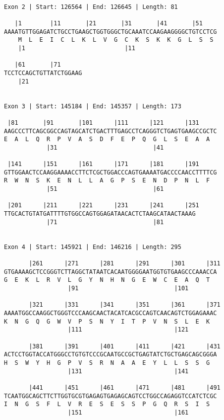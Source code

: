 \documentclass{article}
\begin{document}
 \begin{Verbatim}
 
Exon 2 | Start: 126564 | End: 126645 | Length: 81
 
   |1        |11       |21       |31       |41       |51    
AAAATGTTGGAGATCTGCCTGAAGCTGGTGGGCTGCAAATCCAAGAAGGGGCTGTCCTCG
    M  L  E  I  C  L  K  L  V  G  C  K  S  K  K  G  L  S  S 
    |1                            |11                       
  
   |61       |71      
TCCTCCAGCTGTTATCTGGAAG
    |21               
  
 
Exon 3 | Start: 145184 | End: 145357 | Length: 173
 
 |81       |91       |101      |111      |121      |131     
AAGCCCTTCAGCGGCCAGTAGCATCTGACTTTGAGCCTCAGGGTCTGAGTGAAGCCGCTC
E  A  L  Q  R  P  V  A  S  D  F  E  P  Q  G  L  S  E  A  A  
            |31                           |41               
  
 |141      |151      |161      |171      |181      |191     
GTTGGAACTCCAAGGAAAACCTTCTCGCTGGACCCAGTGAAAATGACCCCAACCTTTTCG
R  W  N  S  K  E  N  L  L  A  G  P  S  E  N  D  P  N  L  F  
            |51                           |61               
  
 |201      |211      |221      |231      |241      |251
TTGCACTGTATGATTTTGTGGCCAGTGGAGATAACACTCTAAGCATAACTAAAG
            |71                           |81         
  
 
Exon 4 | Start: 145921 | End: 146216 | Length: 295
 
       |261      |271      |281      |291      |301      |311
GTGAAAAGCTCCGGGTCTTAGGCTATAATCACAATGGGGAATGGTGTGAAGCCCAAACCA
G  E  K  L  R  V  L  G  Y  N  H  N  G  E  W  C  E  A  Q  T  
                  |91                           |101        
  
       |321      |331      |341      |351      |361      |371
AAAATGGCCAAGGCTGGGTCCCAAGCAACTACATCACGCCAGTCAACAGTCTGGAGAAAC
K  N  G  Q  G  W  V  P  S  N  Y  I  T  P  V  N  S  L  E  K  
                  |111                          |121        
  
       |381      |391      |401      |411      |421      |431
ACTCCTGGTACCATGGGCCTGTGTCCCGCAATGCCGCTGAGTATCTGCTGAGCAGCGGGA
H  S  W  Y  H  G  P  V  S  R  N  A  A  E  Y  L  L  S  S  G  
                  |131                          |141        
  
       |441      |451      |461      |471      |481      |491
TCAATGGCAGCTTCTTGGTGCGTGAGAGTGAGAGCAGTCCTGGCCAGAGGTCCATCTCGC
I  N  G  S  F  L  V  R  E  S  E  S  S  P  G  Q  R  S  I  S  
                  |151                          |161        
  

\end{Verbatim}
\end{document}

